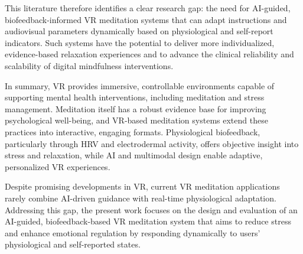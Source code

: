This literature therefore identifies a clear research gap: the need for AI-guided, biofeedback-informed VR meditation systems that can adapt instructions and audiovisual parameters dynamically based on physiological and self-report indicators. Such systems have the potential to deliver more individualized, evidence-based relaxation experiences and to advance the clinical reliability and scalability of digital mindfulness interventions.

In summary, VR provides immersive, controllable environments capable of supporting mental health interventions, including meditation and stress management. Meditation itself has a robust evidence base for improving psychological well-being, and VR-based meditation systems extend these practices into interactive, engaging formats. Physiological biofeedback, particularly through HRV and electrodermal activity, offers objective insight into stress and relaxation, while AI and multimodal design enable adaptive, personalized VR experiences.

Despite promising developments in VR, current VR meditation applications rarely combine AI-driven guidance with real-time physiological adaptation. Addressing this gap, the present work focuses on the design and evaluation of an AI-guided, biofeedback-based VR meditation system that aims to reduce stress and enhance emotional regulation by responding dynamically to users’ physiological and self-reported states.









